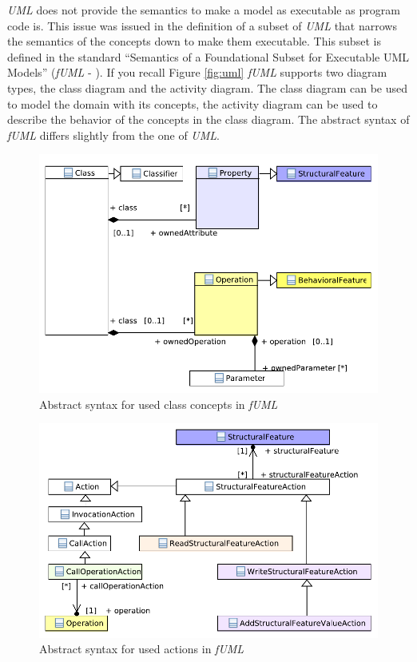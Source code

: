 \documentclass{llncs}
\begin{document}
\textit{UML} does not provide the semantics to make a model as executable as program code is. This issue was issued in the definition of a subset of \textit{UML} that narrows the semantics of the concepts down to make them executable. This subset is defined in the standard ``Semantics of a Foundational Subset for Executable UML Models'' (\textit{fUML} - \cite{man:FUML}). If you recall Figure \ref{fig:uml} \textit{fUML} supports two diagram types, the class diagram and the activity diagram. The class diagram can be used to model the domain with its concepts, the activity diagram can be used to describe the behavior of the concepts in the class diagram. The abstract syntax of \textit{fUML} differs slightly from the one of \textit{UML}.

\begin{figure}[h!t]
 \centering
 \includegraphics[scale=0.9]{images/Model_Model_Classifiers}
 \caption{Abstract syntax for used class concepts in \textit{fUML}}
 \label{fig:fuml1}
\end{figure}

\begin{figure}[h!t]
 \centering
 \includegraphics[scale=0.9]{images/Model_Model_Behavior}
 \caption{Abstract syntax for used actions in \textit{fUML}}
 \label{fig:fuml2}
\end{figure}
\end{document}
